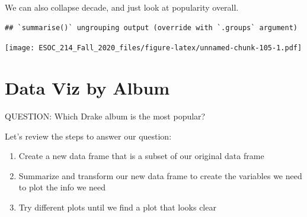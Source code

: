 \documentclass[
]{book}
\newenvironment{Shaded}{\begin{snugshade}}{\end{snugshade}}
\newcommand{\DataTypeTok}[1]{\textcolor[rgb]{0.13,0.29,0.53}{#1}}
\newcommand{\DecValTok}[1]{\textcolor[rgb]{0.00,0.00,0.81}{#1}}
\newcommand{\KeywordTok}[1]{\textcolor[rgb]{0.13,0.29,0.53}{\textbf{#1}}}
\newcommand{\NormalTok}[1]{#1}
\newcommand{\OperatorTok}[1]{\textcolor[rgb]{0.81,0.36,0.00}{\textbf{#1}}}
\newcommand{\StringTok}[1]{\textcolor[rgb]{0.31,0.60,0.02}{#1}}
\begin{document}
We can also collapse decade, and just look at popularity overall.

\begin{Shaded}
\end{Shaded}

\begin{verbatim}
## `summarise()` ungrouping output (override with `.groups` argument)
\end{verbatim}

\texttt{[image: ESOC\_214\_Fall\_2020\_files/figure-latex/unnamed-chunk-105-1.pdf]}

\hypertarget{data-viz-by-album}{%
\section{Data Viz by Album}\label{data-viz-by-album}}

QUESTION: Which Drake album is the most popular?

Let's review the steps to answer our question:

\begin{enumerate}
\def\labelenumi{\arabic{enumi})}
\item
  Create a new data frame that is a subset of our original data frame
\item
  Summarize and transform our new data frame to create the variables we need to plot the info we need
\item
  Try different plots until we find a plot that looks clear
\end{enumerate}
\end{document}
